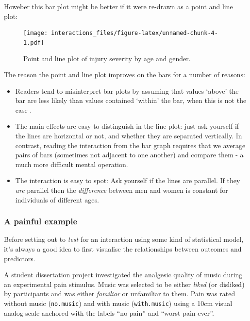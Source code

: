 \documentclass[]{article}
\theoremstyle{definition}
\theoremstyle{definition}
\theoremstyle{definition}
\theoremstyle{remark}
\begin{document}
Howeber this bar plot might be better if it were re-drawn as a point and
line plot:

\begin{figure}
\centering
\texttt{[image: interactions\_files/figure-latex/unnamed-chunk-4-1.pdf]}
\caption{\label{fig:unnamed-chunk-4}Point and line plot of injury severity
by age and gender.}
\end{figure}

The reason the point and line plot improves on the bars for a number of
reasons:

\begin{itemize}
\item
  Readers tend to misinterpret bar plots by assuming that values `above'
  the bar are less likely than values contained `within' the bar, when
  this is not the case \citep{newman2012bar}.
\item
  The main effects are easy to distinguish in the line plot: just ask
  yourself if the lines are horizontal or not, and whether they are
  separated vertically. In contrast, reading the interaction from the
  bar graph requires that we average pairs of bars (sometimes not
  adjacent to one another) and compare them - a much more difficult
  mental operation.
\item
  The interaction is easy to spot: Ask yourself if the lines are
  parallel. If they \emph{are} parallel then the \emph{difference}
  between men and women is constant for individuals of different ages.
\end{itemize}

\hypertarget{pain-music-data}{\subsubsection*{A painful
example}\label{pain-music-data}}

Before setting out to \emph{test} for an interaction using some kind of
statistical model, it's always a good idea to first visualise the
relationships between outcomes and predictors.

A student dissertation project investigated the analgesic quality of
music during an experimental pain stimulus. Music was selected to be
either \emph{liked} (or disliked) by participants and was either
\emph{familiar} or unfamiliar to them. Pain was rated without music
(\texttt{no.music}) and with music (\texttt{with.music}) using a 10cm
visual analog scale anchored with the labels ``no pain'' and ``worst
pain ever''.
\end{document}
